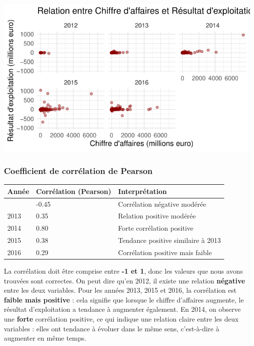 \documentclass[mstat,12pt]{unswthesis}
\begin{document}
\includegraphics{TDDT_projet_L_2_files/figure-latex/nuage_point_anness-1.pdf}

\subsubsection{Coefficient de corrélation de
Pearson}\label{coefficient-de-corruxe9lation-de-pearson}

\medskip

\begin{longtable}[]{@{}lll@{}}
\toprule\noalign{}
Année & Corrélation (Pearson) & Interprétation \\
\midrule\noalign{}
\endhead
\bottomrule\noalign{}
\endlastfoot
2012 & -0.45 & Corrélation négative modérée \\
2013 & 0.35 & Relation positive modérée \\
2014 & 0.80 & Forte corrélation positive \\
2015 & 0.38 & Tendance positive similaire à 2013 \\
2016 & 0.29 & Corrélation positive mais faible \\
\end{longtable}

\medskip

La corrélation doit être comprise entre \textbf{-1 et 1}, donc les
valeurs que nous avons trouvées sont correctes. On peut dire qu'en 2012,
il existe une relation \textbf{négative} entre les deux variables. Pour
les années 2013, 2015 et 2016, la corrélation est \textbf{faible mais
positive} : cela signifie que lorsque le chiffre d'affaires augmente, le
résultat d'exploitation a tendance à augmenter également. En 2014, on
observe une \textbf{forte} corrélation positive, ce qui indique une
relation claire entre les deux variables : elles ont tendance à évoluer
dans le même sens, c'est-à-dire à augmenter en même temps.
\end{document}
